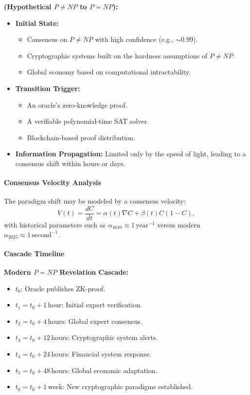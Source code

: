 \documentclass[11pt]{article}
\begin{document}
\textbf{(Hypothetical $P \neq NP$ to $P=NP$):}
\begin{itemize}
    \item \textbf{Initial State:} 
    \begin{itemize}
        \item Consensus on $P \neq NP$ with high confidence (e.g., $\sim$0.99).
        \item Cryptographic systems built on the hardness assumptions of $P \neq NP$.
        \item Global economy based on computational intractability.
    \end{itemize}
    \item \textbf{Transition Trigger:} 
    \begin{itemize}
        \item An oracle's zero-knowledge proof.
        \item A verifiable polynomial-time SAT solver.
        \item Blockchain-based proof distribution.
    \end{itemize}
    \item \textbf{Information Propagation:} Limited only by the speed of light, leading to a consensus shift within hours or days.
\end{itemize}

\paragraph{Consensus Velocity Analysis}

The paradigm shift may be modeled by a consensus velocity:
\[
V(t) = \frac{dC}{dt} = \alpha(t) \nabla C + \beta(t) C (1-C),
\]
with historical parameters such as $\alpha_{1610}\approx 1\,\text{year}^{-1}$ versus modern $\alpha_{2025}\approx 1\,\text{second}^{-1}$.

\paragraph{Cascade Timeline}

\textbf{Modern $P=NP$ Revelation Cascade:}
\begin{itemize}
    \item $t_0$: Oracle publishes ZK-proof.
    \item $t_1=t_0+1\,\text{hour}$: Initial expert verification.
    \item $t_2=t_0+4\,\text{hours}$: Global expert consensus.
    \item $t_3=t_0+12\,\text{hours}$: Cryptographic system alerts.
    \item $t_4=t_0+24\,\text{hours}$: Financial system response.
    \item $t_5=t_0+48\,\text{hours}$: Global economic adaptation.
    \item $t_6=t_0+1\,\text{week}$: New cryptographic paradigms established.
\end{itemize}
\end{document}
